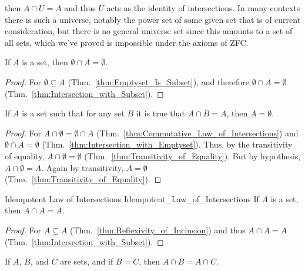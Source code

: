         then $A\cap{U}=A$ and thus $U$ acts as the identity of intersections. In
        many contexts there is such a universe, notably the power set of some
        given set that is of current consideration, but there is no general
        universe set since this amounts to a set of all sets, which we've proved
        is impossible under the axioms of ZFC.
        \begin{theorem}
            \label{thm:Intersection_with_Emptyset}%
            If $A$ is a set, then $\emptyset\cap{A}=\emptyset$.
        \end{theorem}
        \begin{proof}
            For $\emptyset\subseteq{A}$ (Thm.~\ref{thm:Emptyset_Is_Subset}), and
            therefore $\emptyset\cap{A}=\emptyset$
            (Thm.~\ref{thm:Intersection_with_Subset}).
        \end{proof}
        \begin{theorem}
            \label{thm:Empty_Set_Is_Zero_for_Intersections}%
            If $A$ is a set such that for any set $B$ it is true that
            $A\cap{B}=A$, then $A=\emptyset$.
        \end{theorem}
        \begin{proof}
            For $A\cap\emptyset=\emptyset\cap{A}$
            (Thm.~\ref{thm:Commutative_Law_of_Intersections}) and
            $\emptyset\cap{A}=\emptyset$
            (Thm.~\ref{thm:Intersection_with_Emptyset}). Thus, by the
            transitivity of equality, $A\cap\emptyset=\emptyset$
            (Thm.~\ref{thm:Transitivity_of_Equality}). But by hypothesis,
            $A\cap\emptyset=A$. Again by transitivity, $A=\emptyset$
            (Thm.~\ref{thm:Transitivity_of_Equality}).
        \end{proof}
        \begin{ltheorem}{Idempotent Law of Intersections}
                        {Idempotent_Law_of_Intersections}
            If $A$ is a set, then $A\cap{A}=A$.
        \end{ltheorem}
        \begin{proof}
            For $A\subseteq{A}$ (Thm.~\ref{thm:Reflexivity_of_Inclusion}) and
            thus $A\cap{A}=A$ (Thm.~\ref{thm:Intersection_with_Subset}).
        \end{proof}
        \begin{theorem}
            \label{thm:Intersection_with_Equal_Sets}%
            If $A$, $B$, and $C$ are sets, and if $B=C$, then
            $A\cap{B}=A\cap{C}$.
        \end{theorem}
